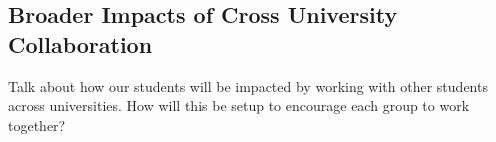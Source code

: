 \subsection{Broader Impacts of Cross University Collaboration}
\label{subsec:broader_impacts_of_cross_university_collaboration}
Talk about how our students will be impacted by working with other
students across universities.  How will this be setup to encourage
each group to work together?
